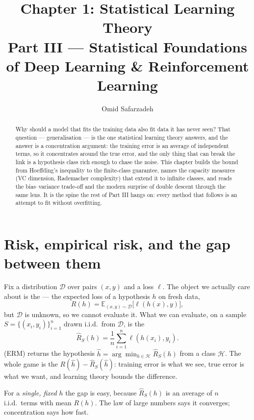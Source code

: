 \documentclass[11pt]{article}
\title{Chapter 1: Statistical Learning Theory \\ \large Part III --- Statistical Foundations of Deep Learning \& Reinforcement Learning}
\author{Omid Safarzadeh}
\date{}
\begin{document}
\maketitle

\begin{abstract}
\noindent
Why should a model that fits the training data also fit data it has never seen?
That question --- generalisation --- is the one statistical learning theory
answers, and the answer is a concentration argument: the training error is an
average of independent terms, so it concentrates around the true error, and the
only thing that can break the link is a hypothesis class rich enough to chase
the noise. This chapter builds the bound from Hoeffding's inequality to the
finite-class guarantee, names the capacity measures (VC dimension, Rademacher
complexity) that extend it to infinite classes, and reads the bias--variance
trade-off and the modern surprise of double descent through the same lens. It
is the spine the rest of Part III hangs on: every method that follows is an
attempt to fit without overfitting.
\end{abstract}

\tableofcontents

\section{Risk, empirical risk, and the gap between them}

Fix a distribution $\mathcal{D}$ over pairs $(x,y)$ and a loss $\ell$. The
object we actually care about is the  --- the expected loss of a
hypothesis $h$ on fresh data,
\[
  R(h) = \mathbb{E}_{(x,y)\sim\mathcal{D}}\big[\ell(h(x),y)\big],
\]
but $\mathcal{D}$ is unknown, so we cannot evaluate it. What we can evaluate, on
a sample $S=\{(x_i,y_i)\}_{i=1}^n$ drawn i.i.d.\ from $\mathcal{D}$, is the
\[
  \widehat R_S(h) = \frac1n\sum_{i=1}^n \ell(h(x_i),y_i).
\]
 (ERM) returns the hypothesis
$\hat h = \arg\min_{h\in\mathcal{H}} \widehat R_S(h)$ from a class $\mathcal{H}$.
The whole game is the  $R(\hat h) - \widehat R_S(\hat h)$:
training error is what we see, true error is what we want, and learning theory
bounds the difference.

For a \emph{single, fixed} $h$ the gap is easy, because $\widehat R_S(h)$ is an
average of $n$ i.i.d.\ terms with mean $R(h)$. The law of large numbers says it
converges; concentration says how fast.
\end{document}

